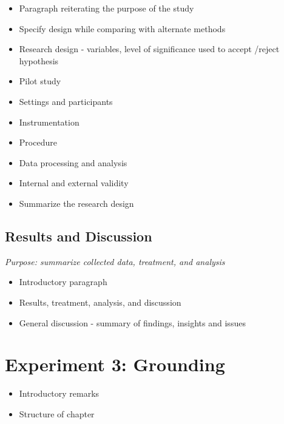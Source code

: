 \begin{itemize}
\item Paragraph reiterating the purpose of the study

\item Specify design while comparing with alternate methods

\item Research design - variables, level of significance used to accept \slash  reject hypothesis

\item Pilot study

\item Settings and participants

\item Instrumentation

\item Procedure

\item Data processing and analysis

\item Internal and external validity

\item Summarize the research design

\end{itemize}

\subsection{Results and Discussion}
\label{resultsanddiscussion}

\emph{Purpose: summarize collected data, treatment, and analysis}

\begin{itemize}
\item Introductory paragraph

\item Results, treatment, analysis, and discussion

\item General discussion - summary of findings, insights and issues

\end{itemize}

\section{Experiment 3: Grounding}
\label{experiment3:grounding}

\begin{itemize}
\item Introductory remarks

\item Structure of chapter

\end{itemize}

